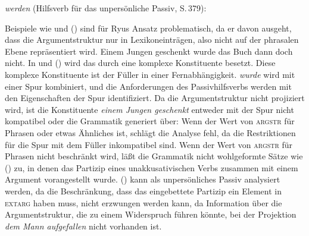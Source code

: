 {\eas
\emph{werden} (Hilfsverb für das unpersönliche Passiv, S.\,379):\\
\zs

\noindent
Beispiele wie  und () sind für
Ryus Ansatz problematisch, da er davon ausgeht, dass die Argumentstruktur
nur in Lexikoneinträgen, also nicht auf der phrasalen Ebene repräsentiert wird.
\ea
Einem Jungen    geschenkt wurde das Buch       dann doch      nicht.
\z
In  und () wird das \vf durch eine
komplexe Konstituente besetzt. Diese komplexe Konstituente ist der Füller in einer
Fernabhängigkeit. \emph{wurde} wird mit einer Spur kombiniert, und die Anforderungen
des Passivhilfsverbs werden mit den Eigenschaften der Spur identifiziert.
Da die Argumentstruktur nicht projiziert wird, ist die Konstituente
\emph{einem Jungen geschenkt} entweder mit der Spur nicht kompatibel
oder die Grammatik generiert über:
Wenn der Wert von \textsc{argstr} für Phrasen  oder etwas Ähnliches ist,
schlägt die Analyse fehl, da die Restriktionen für die Spur mit dem Füller inkompatibel sind.
Wenn der Wert von \textsc{argstr} für Phrasen nicht beschränkt wird, läßt
die Grammatik nicht wohlgeformte Sätze wie () zu, in denen das Partizip eines
unakkusativischen Verbs zusammen mit einem Argument vorangestellt wurde.
\z
() kann als unpersönliches Passiv analysiert werden, da die Beschränkung,
dass das eingebettete Partizip ein Element in \textsc{extarg} haben muss, nicht 
erzwungen werden kann, da Information über die Argumentstruktur, die zu einem Widerspruch führen
könnte, bei der Projektion \emph{dem Mann aufgefallen} nicht vorhanden ist.




}
